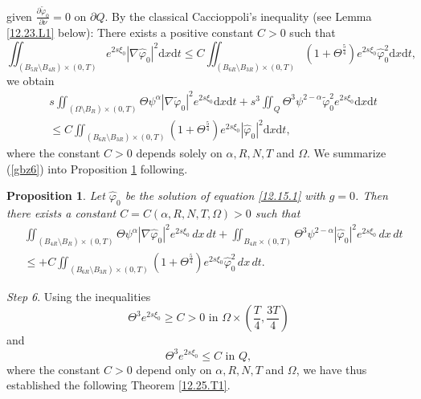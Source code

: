 \documentclass[11pt]{article}
\def\dref#1{(\ref{#1})}
\newtheorem{proposition}{Proposition}
\numberwithin{equation}{section}
\def\dref#1{(\ref{#1})}
\def\pt{\partial}
\def\vp{\varphi}
\def\pt{\partial}
\def\Om{\Omega}
\def\al{\alpha}
\def\f{\frac}
\def\df{\mathrm d}
\def\wt{\widetilde}
\def\wh{\widehat}
\begin{document}
given $\f{\pt\wt\vp_0}{\pt\nu}=0$ on $\pt Q$. By the classical Caccioppoli's inequality (see Lemma \ref{12.23.L1} below): There exists a positive constant $C>0$ such that
\begin{equation*}
\iint_{(B_{5R}\setminus B_{4R})\times (0,T)} e^{2s\xi_0}|\nabla \wh\vp_0|^2\df x\df t\leq C\iint_{(B_{6R}\setminus B_{3R})\times (0,T)} (1+\Theta^\f{5}{4})e^{2s\xi_0} \wh\vp_0^2\df x\df t,
\end{equation*}
we obtain
\begin{equation}\label{gbz6}
\begin{split}
&s\iint_{(\Om\setminus B_R)\times (0,T)} \Theta \psi^\al |\nabla \wt\vp_0|^2e^{2s\xi_0}\df x\df t+s^3\iint_Q\Theta^3\psi^{2-\al}\wt \vp_0^2e^{2s\xi_0}\df x\df t\\
&\leq C \iint_{(B_{6R}\setminus B_{3R})\times (0,T)} (1+\Theta^\f{5}{4})e^{2s\xi_0} |\wh\vp_0|^2 \df x\df t,
\end{split}
\end{equation}
where the constant  $C>0$ depends solely on $\al, R, N, T$ and $\Om$.
 We summarize \dref{gbz6} into  Proposition \ref{12.23.P1} following.

 \begin{proposition}\label{12.23.P1}
Let $\widehat{\varphi}_0$ be the solution of equation \eqref{12.15.1} with $g=0$.
Then there exists a constant $C=C(\alpha, R, N, T,\Omega)>0$ such that
\begin{equation*}
\begin{split}
&\iint_{(B_{4R}\setminus B_R)\times (0,T)} \Theta \psi^\alpha |\nabla \widehat{\varphi}_0|^2e^{2s\xi_0}\,dx\,dt+\iint_{B_{4R}\times (0,T)}\Theta^3\psi^{2-\alpha} |\widehat{\varphi}_0|^2e^{2s\xi_0}\,dx\,dt\\
&\leq +C\iint_{(B_{6R}\setminus B_{3R})\times (0,T)} (1+\Theta^{\frac{5}{4}})e^{2s\xi_0}\widehat{\varphi}_0^2\,dx\,dt.
\end{split}
\end{equation*}
\end{proposition}
{\it Step 6}. Using the inequalities
\begin{equation*}
\Theta^3e^{2s\xi_0}\geq C>0   \text{  in }\Omega\times \left(\frac{T}{4}, \frac{3T}{4}\right)
\end{equation*}
and
\begin{equation*}
\Theta^3e^{2s\xi_0}\leq C   \text{  in }Q,
\end{equation*}
where the constant $C>0$ depend only on $\alpha, R, N, T$ and $\Omega$, we have thus established
the following Theorem \ref{12.25.T1}.
\end{document}
